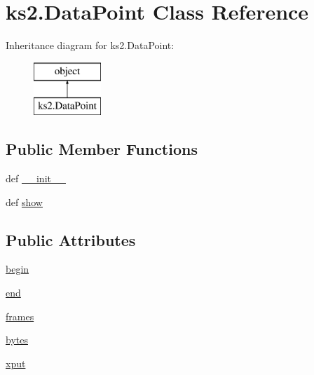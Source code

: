 \hypertarget{classks2_1_1_data_point}{\section{ks2.\-Data\-Point Class Reference}
\label{classks2_1_1_data_point}
}
Inheritance diagram for ks2.\-Data\-Point\-:\begin{figure}[H]
\begin{center}
\leavevmode
\includegraphics[height=2.000000cm]{classks2_1_1_data_point}
\end{center}
\end{figure}
\subsection*{Public Member Functions}
\begin{DoxyCompactItemize}
\item 
def \hyperlink{classks2_1_1_data_point_ab22340cdf5d06004c1c96c75c5ee0138}{\-\_\-\-\_\-init\-\_\-\-\_\-}
\item 
def \hyperlink{classks2_1_1_data_point_a828583eba2493fdcd5d05a1dc34be764}{show}
\end{DoxyCompactItemize}
\subsection*{Public Attributes}
\begin{DoxyCompactItemize}
\item 
\hyperlink{classks2_1_1_data_point_a5109060f0ce2171d154560ae1f7ea618}{begin}
\item 
\hyperlink{classks2_1_1_data_point_a4898a56ed7246eb33a295da6496566d6}{end}
\item 
\hyperlink{classks2_1_1_data_point_a214dead1966be1f38aa5bb5858ba8bf6}{frames}
\item 
\hyperlink{classks2_1_1_data_point_ad5e6469cea32af6efb8803f300bb9dee}{bytes}
\item 
\hyperlink{classks2_1_1_data_point_a129a9557c8d54633b893753d8e272423}{xput}
\end{DoxyCompactItemize}


